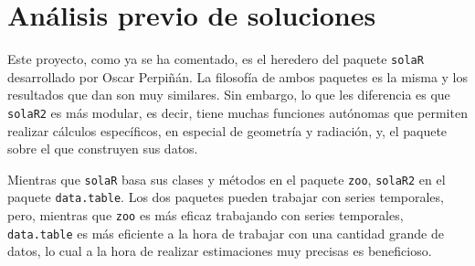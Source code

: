 \section{Análisis previo de soluciones}
\label{sec:org14fdb72}
Este proyecto, como ya se ha comentado, es el heredero del paquete \texttt{solaR} desarrollado por Oscar Perpiñán. La filosofía de ambos paquetes es la misma y los resultados que dan son muy similares. Sin embargo, lo que les diferencia es que \texttt{solaR2} es más modular, es decir, tiene muchas funciones autónomas que permiten realizar cálculos específicos, en especial de geometría y radiación, y, el paquete sobre el que construyen sus datos.

Mientras que \texttt{solaR} basa sus clases y métodos en el paquete \texttt{zoo}, \texttt{solaR2} en el paquete \texttt{data.table}. Los dos paquetes pueden trabajar con series temporales, pero, mientras que \texttt{zoo} es más eficaz trabajando con series temporales, \texttt{data.table} es más eficiente a la hora de trabajar con una cantidad grande de datos, lo cual a la hora de realizar estimaciones muy precisas es beneficioso.

